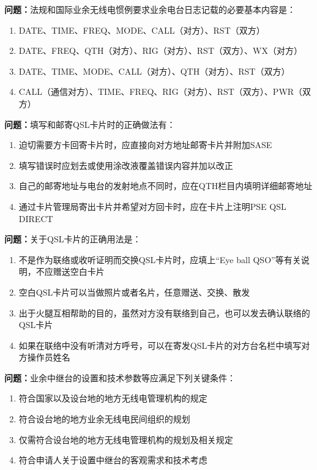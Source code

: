 \textbf{问题：}法规和国际业余无线电惯例要求业余电台日志记载的必要基本内容是：
\begin{enumerate}[label=\Alph*), leftmargin=1.5cm]
	\item DATE、TIME、FREQ、MODE、CALL（对方）、RST（双方）
	\item DATE、FREQ、QTH（对方）、RIG（对方）、RST（双方）、WX（对方）
	\item DATE、TIME、MODE、CALL（对方）、QTH（对方）、RST（双方）
	\item CALL（通信对方）、TIME、FREQ、RIG（对方）、RST（双方）、PWR（双方）
\end{enumerate}

\textbf{问题：}填写和邮寄QSL卡片时的正确做法有：
\begin{enumerate}[label=\Alph*), leftmargin=1.5cm]
	\item 迫切需要方卡回寄卡片时，应直接向对方地址邮寄卡片并附加SASE
	\item 填写错误时应划去或使用涂改液覆盖错误内容并加以改正
	\item 自己的邮寄地址与电台的发射地点不同时，应在QTH栏目内填明详细邮寄地址
	\item 通过卡片管理局寄出卡片并希望对方回卡时，应在卡片上注明PSE QSL DIRECT
\end{enumerate}

\textbf{问题：}关于QSL卡片的正确用法是：
\begin{enumerate}[label=\Alph*), leftmargin=1.5cm]
	\item 不是作为联络或收听证明而交换QSL卡片时，应填上“Eye ball QSO”等有关说明，不应赠送空白卡片
	\item 空白QSL卡片可以当做照片或者名片，任意赠送、交换、散发
	\item 出于火腿互相帮助的目的，虽然对方没有联络到自己，也可以发去确认联络的QSL卡片
	\item 如果在联络中没有听清对方呼号，可以在寄发QSL卡片的对方台名栏中填写对方操作员姓名
\end{enumerate}

\textbf{问题：}业余中继台的设置和技术参数等应满足下列关键条件：
\begin{enumerate}[label=\Alph*), leftmargin=1.5cm]
	\item 符合国家以及设台地的地方无线电管理机构的规定
	\item 符合设台地的地方业余无线电民间组织的规划
	\item 仅需符合设台地的地方无线电管理机构的规划及相关规定
	\item 符合申请人关于设置中继台的客观需求和技术考虑
\end{enumerate}

